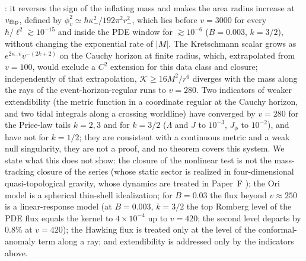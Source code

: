 \documentclass[11pt]{article}
\begin{document}
\citet{Barcelo2022}: it reverses the sign of the inflating mass and makes the area radius increase at $v_{\rm flip}$, defined by $\phi_v^2\simeq\hbar\kappa_-^2/192\pi^2r_-^2$, which lies before $v=3000$ for every $\hbar/\ell^2\gtrsim10^{-15}$ and inside the PDE window for $\gtrsim10^{-6}$ ($B=0.003$, $k=3/2$), without changing the exponential rate of $|M|$. The Kretschmann scalar grows as $e^{2\kappa_-v}v^{-(2k+2)}$ on the Cauchy horizon at finite radius, which, extrapolated from $v=100$, would exclude a $C^2$ extension for this data class and closure; independently of that extrapolation, $\mathcal K\ge16M^2/r^6$ diverges with the mass along the rays of the event-horizon-regular runs to $v=280$. Two indicators of weaker extendibility (the metric function in a coordinate regular at the Cauchy horizon, and two tidal integrals along a crossing worldline) have converged by $v=280$ for the Price-law tails $k=2,3$ and for $k=3/2$ ($\Lambda$ and $J$ to $10^{-3}$, $J_\phi$ to $10^{-2}$), and have not for $k=1/2$; they are consistent with a continuous metric and a weak null singularity, they are not a proof, and no theorem covers this system. We state what this does not show: the closure of the nonlinear test is not the mass-tracking closure of the series (whose static sector is realized in four-dimensional quasi-topological gravity, whose dynamics are treated in Paper~F \citep{PaperF}); the Ori model is a spherical thin-shell idealization; for $B=0.03$ the flux beyond $v\approx250$ is a linear-response model (at $B=0.003$, $k=3/2$ the top Romberg level of the PDE flux equals the kernel to $4\times10^{-4}$ up to $v=420$; the second level departs by $0.8\%$ at $v=420$); the Hawking flux is treated only at the level of the conformal-anomaly term along a ray; and extendibility is addressed only by the indicators above.
\end{document}
